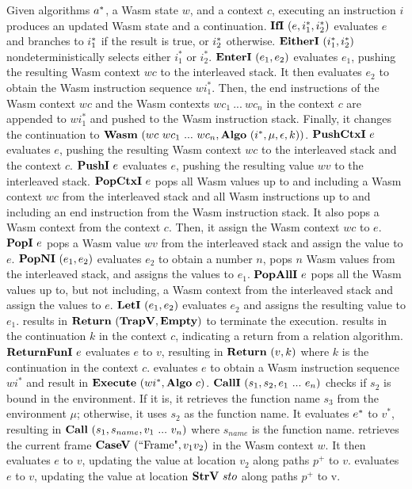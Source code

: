Given algorithms $a^*$, a Wasm state $w$, and a context $c$, executing an
instruction $i$ produces an updated Wasm state and a continuation.
$\textbf{IfI} ~ (e, i_1^*, i_2^*)${} evaluates $e$ and branches to $i^*_1$ if the
result is true, or $i^*_2$ otherwise.
$\textbf{EitherI} ~ (i_1^*, i_2^*)${} nondeterministically selects either $i_1^*$ or
$i_2^*$.
$\textbf{EnterI} ~ (e_1, e_2)${} evaluates $e_1$, pushing the resulting Wasm context
$wc$ to the interleaved stack.
It then evaluates $e_2$ to obtain the Wasm instruction sequence $wi_1^*$.
Then, the end instructions of the Wasm context $wc$ and the Wasm contexts
$wc_1 ~ ... ~ wc_n$ in the context $c$ are appended to $wi_1^*$ and pushed to
the Wasm instruction stack.
Finally, it changes the continuation to
$\textbf{Wasm} ~ (wc ~ wc_1 ~ ... ~ wc_n, \textbf{Algo} ~ (i^*, \mu, \epsilon, k))${}.
$\textbf{PushCtxI} ~ e${} evaluates $e$, pushing the resulting Wasm context $wc$ to the
interleaved stack and the context $c$.
$\textbf{PushI} ~ e${} evaluates $e$, pushing the resulting value $wv$ to the
interleaved stack.
$\textbf{PopCtxI} ~ e${} pops all Wasm values up to and including a Wasm context $wc$
from the interleaved stack and all Wasm instructions up to and including an end
instruction from the Wasm instruction stack.
It also pops a Wasm context from the context $c$.
Then, it assign the Wasm context $wc$ to $e$.
$\textbf{PopI} ~ e${} pops a Wasm value $wv$ from the interleaved stack and assign the
value to $e$.
$\textbf{PopNI} ~ (e_1, e_2)${} evaluates $e_2$ to obtain a number $n$, pops $n$ Wasm
values from the interleaved stack, and assigns the values to $e_1$.
$\textbf{PopAllI} ~ e${} pops all the Wasm values up to, but not including, a
Wasm context from the interleaved stack and assign the values to $e$.
$\textbf{LetI} ~ (e_1, e_2)${} evaluates $e_2$ and assigns the resulting value to
$e_1$.
\trapi{} results in $\textbf{Return} ~ (\textbf{TrapV}{}, \textbf{Empty}{})$ to terminate the execution.
\returnreli{} results in the continuation $k$ in the context $c$, indicating a
return from a relation algorithm.
$\textbf{ReturnFunI} ~ e${} evaluates $e$ to $v$, resulting in $\textbf{Return} ~ (v, k)${} where
$k$ is the continuation in the context $c$.
\executei{} evaluates $e$ to obtain a Wasm instruction sequence $wi^*$ and
result in $\textbf{Execute} ~ (wi^*, \textbf{Algo} ~ c)${}.
$\textbf{CallI} ~ (s_1, s_2, e_1 ~ ... ~ e_n)${} checks if $s_2$ is bound in the
environment.
If it is, it retrieves the function name $s_3$ from the environment $\mu$;
otherwise, it uses $s_2$ as the function name.
It evaluates $e^*$ to $v^*$, resulting in $\textbf{Call} ~ (s_1, s_{name}, v_1 ~ ...
~ v_n)${} where $s_{name}$ is the function name.
\replaceframei{} retrieves the current frame $\textbf{CaseV} ~ (\text{``Frame"}, v_1
v_2)${} in the Wasm context $w$.
It then evaluates $e$ to $v$, updating the value at location $v_2$ along paths
$p^+$ to $v$.
\replacestorei{} evaluates $e$ to $v$, updating the value at location $\textbf{StrV} ~
sto$ along paths $p^+$ to v.




